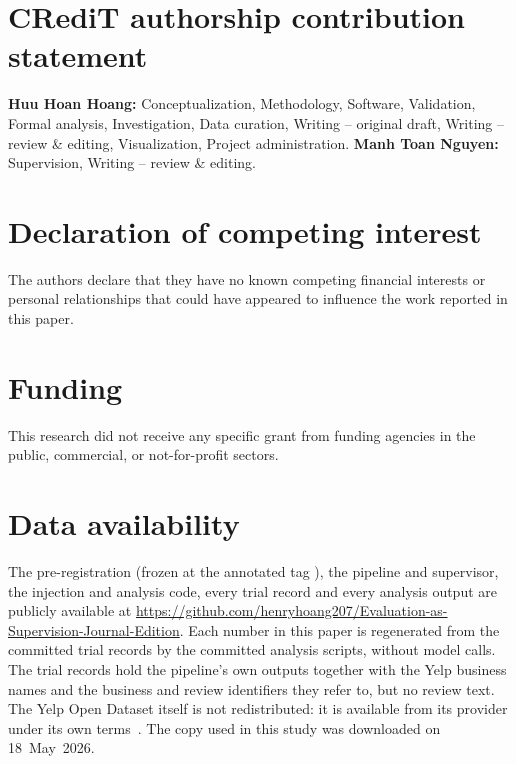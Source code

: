 
\section*{CRediT authorship contribution statement}
\textbf{Huu Hoan Hoang:} Conceptualization, Methodology, Software, Validation,
Formal analysis, Investigation, Data curation, Writing -- original draft,
Writing -- review \& editing, Visualization, Project administration.
\textbf{Manh Toan Nguyen:} Supervision, Writing -- review \& editing.

\section*{Declaration of competing interest}
The authors declare that they have no known competing financial interests or
personal relationships that could have appeared to influence the work reported
in this paper.

\section*{Funding}
This research did not receive any specific grant from funding agencies in the
public, commercial, or not-for-profit sectors.

\section*{Data availability}
The pre-registration (frozen at the annotated tag ), the
pipeline and supervisor, the injection and analysis code, every trial record and
every analysis output are publicly available at
\url{https://github.com/henryhoang207/Evaluation-as-Supervision-Journal-Edition}.
Each number in this paper is regenerated from the committed trial records by the
committed analysis scripts, without model calls. The trial records hold the
pipeline's own outputs together with the Yelp business names and the business
and review identifiers they refer to, but no review text. The Yelp Open Dataset
itself is not redistributed: it
is available from its provider under its own terms~\citep{yelpdataset}. The
copy used in this study was downloaded on 18~May~2026.

